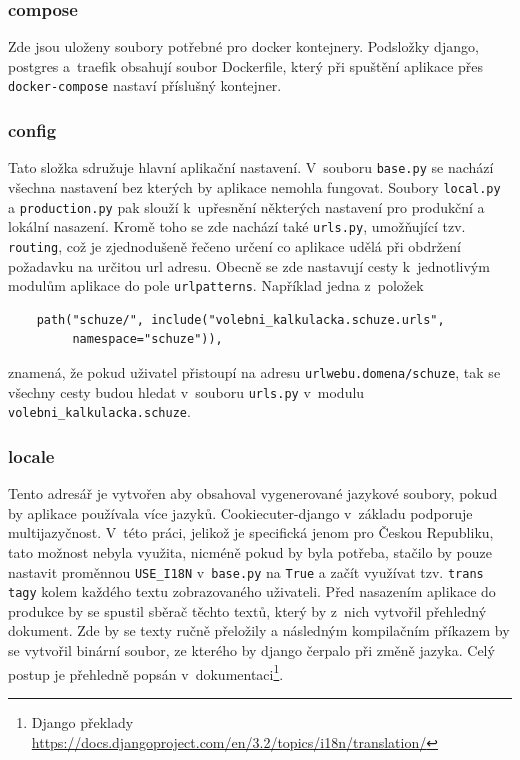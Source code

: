 \subsubsection{compose}
Zde jsou uloženy soubory potřebné pro docker kontejnery. Podsložky django, postgres a~traefik obsahují soubor Dockerfile, který při spuštění aplikace přes \texttt{docker-compose} nastaví příslušný kontejner.

\subsubsection{config}
Tato složka sdružuje hlavní aplikační nastavení. V~souboru \texttt{base.py} se nachází všechna nastavení bez kterých by aplikace nemohla fungovat. Soubory \texttt{local.py} a \texttt{production.py} pak slouží k~upřesnění některých nastavení pro produkční a lokální nasazení. Kromě toho se zde nachází také \texttt{urls.py}, umožňující tzv. \texttt{routing}, což je zjednodušeně řečeno určení co aplikace udělá při obdržení požadavku na určitou url adresu. Obecně se zde nastavují cesty k~jednotlivým modulům aplikace do pole \texttt{urlpatterns}. Například jedna z~položek
\begin{verbatim}
    path("schuze/", include("volebni_kalkulacka.schuze.urls", 
         namespace="schuze")),
\end{verbatim}

znamená, že pokud uživatel přistoupí na adresu \texttt{urlwebu.domena/schuze}, tak se všechny cesty budou hledat v~souboru \texttt{urls.py} v~modulu \texttt{volebni\_kalkulacka.schuze}.

\subsubsection{locale}
Tento adresář je vytvořen aby obsahoval vygenerované jazykové soubory, pokud by aplikace používala více jazyků. Cookiecuter-django v~základu podporuje multijazyčnost. V~této práci, jelikož je specifická jenom pro Českou Republiku, tato možnost nebyla využita, nicméně pokud by byla potřeba, stačilo by pouze nastavit proměnnou \texttt{USE\_I18N} v~\texttt{base.py} na \texttt{True} a začít využívat tzv. \texttt{trans tagy} kolem každého textu zobrazovaného uživateli. Před nasazením aplikace do produkce by se spustil sběrač těchto textů, který by z~nich vytvořil přehledný dokument. Zde by se texty ručně přeložily a následným kompilačním příkazem by se vytvořil binární soubor, ze kterého by django čerpalo při změně jazyka. Celý postup je přehledně popsán v~dokumentaci\footnote{Django překlady \url{https://docs.djangoproject.com/en/3.2/topics/i18n/translation/}}.

